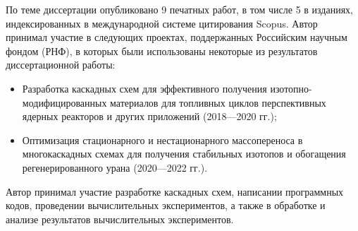 По теме диссертации опубликовано 9 печатных работ, в том числе 5 в изданиях, индексированных в международной системе цитирования Scopus. Автор принимал участие в следующих проектах, поддержанных Российским научным фондом (РНФ), в которых были использованы некоторые из результатов диссертационной работы: 
\begin{itemize}
  \item Разработка каскадных схем для эффективного получения изотопно-модифицированных материалов для топливных циклов перспективных ядерных реакторов и других приложений (2018---2020 гг.);
  \item Оптимизация стационарного и нестационарного массопереноса в многокаскадных схемах для получения стабильных изотопов и обогащения регенерированного урана (2020---2022 гг.).
\end{itemize}


{\contribution} Автор принимал участие разработке каскадных схем, написании программных кодов, проведении вычислительных экспериментов, а также в обработке и анализе результатов вычислительных экспериментов.
